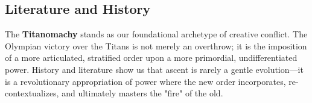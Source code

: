\subsection{Literature and History}
The \textbf{Titanomachy} stands as our foundational archetype of creative conflict. The Olympian victory over the Titans is not merely an overthrow; it is the imposition of a more articulated, stratified order upon a more primordial, undifferentiated power. History and literature show us that ascent is rarely a gentle evolution—it is a revolutionary appropriation of power where the new order incorporates, re-contextualizes, and ultimately masters the "fire" of the old.
